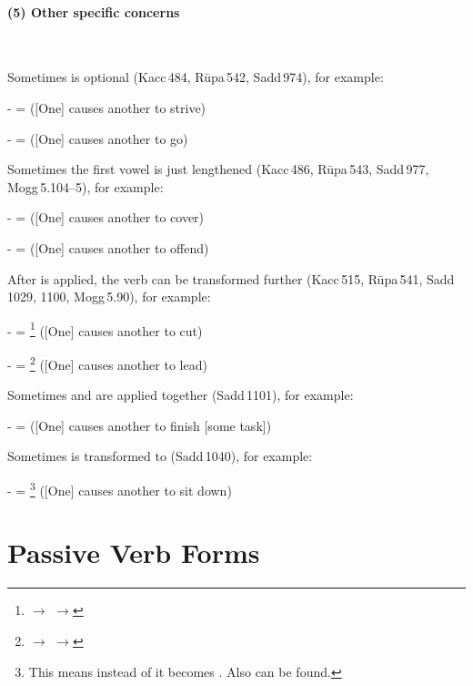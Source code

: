\paragraph*{(5) Other specific concerns} \ \par
Sometimes  is optional (Kacc\,484, R\=upa\,542, Sadd\,974), for example:\par
-  =  ([One] causes another to strive)\par
-  =  ([One] causes another to go)\par
Sometimes the first vowel is just lengthened (Kacc\,486, R\=upa\,543, Sadd\,977, Mogg\,5.104--5), for example:\par
-  =  ([One] causes another to cover)\par
-  =  ([One] causes another to offend)\par
After  is applied, the verb can be transformed further (Kacc\,515, R\=upa\,541, Sadd\,1029, 1100, Mogg\,5.90), for example:\par
-  = \footnote{ $\rightarrow$  $\rightarrow$ } ([One] causes another to cut)\par
-  = \footnote{ $\rightarrow$  $\rightarrow$ } ([One] causes another to lead)\par
Sometimes  and  are applied together (Sadd\,1101), for example:\par
-  =  ([One] causes another to finish [some task])\par
Sometimes  is transformed to  (Sadd\,1040), for example:\par
-  = \footnote{This means instead of  it becomes . Also  can be found.} ([One] causes another to sit down)\par

{}
\section*{Passive Verb Forms}\label{pacca:ya2}\label{pacca:kya}

